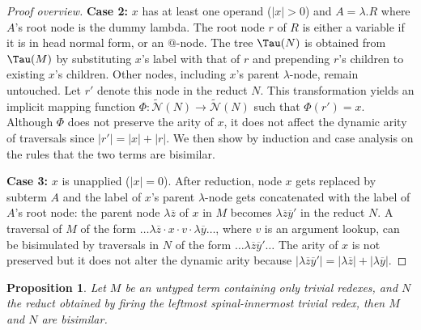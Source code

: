 \documentclass[xchauthor,chkrefs,GCNS,amsmath,amsthm,rotating,leaveRGB]{tcsg}
\theoremstyle{plain}
\newtheorem{proposition}[theorem]{Proposition}
\theoremstyle{definition}
\newcommand{\Nodes}{\mathcal{N}}
\newcommand{\ExtendedNodes}{\tilde{\Nodes}}
\newcommand{\ctree}{\Tau}
\begin{document}
\begin{proof}[Proof overview]
\textbf{Case 2:} $x$ has at least one operand ($|x|>0$) and $A = \lambda . R$
where $A$'s root node is the dummy lambda. The root node $r$ of $R$ is either
a variable if it is in head normal form, or an $@$-node. The tree $\ctree
(N)$ is obtained from $\ctree (M)$ by substituting $x$'s label with that of
$r$ and prepending $r$'s children to existing $x$'s children. Other nodes,
including $x$'s parent $\lambda $-node, remain untouched. Let $r'$ denote
this node in the reduct $N$. This transformation yields an implicit mapping
function $\Phi : \ExtendedNodes (N)\rightarrow \ExtendedNodes (N)$ such that
$\Phi (r') = x$. Although $\Phi $ does not preserve the arity of $x$, it does
not affect the dynamic arity of traversals since $|r'| = |x| + |r|$. We then
show by induction and case analysis on the rules that the two terms are
bisimilar.

\textbf{Case 3:} $x$ is unapplied ($|x|=0$). After reduction, node $x$ gets
replaced by subterm $A$ and the label of $x$'s parent $\lambda $-node gets
concatenated with the label of $A$'s root node: the parent node $\lambda
\overline{z}$ of $x$ in $M$ becomes $\lambda \overline{z}\overline{y}'$ in
the reduct $N$. A traversal of $M$ of the form $\ldots \lambda \overline{z}
\cdot x \cdot v \cdot \lambda \overline{y} \ldots $, where $v$ is an argument
lookup, can be bisimulated by traversals in $N$ of the form $\ldots \lambda
\overline{z}\overline{y}' \ldots $ The arity of $x$ is not preserved but it
does not alter the dynamic arity because $|\lambda{\overline{z}
\overline{y}'}| = |\lambda{\overline{z}}| +  |\lambda{\overline{y}}|$.
\end{proof}


\begin{proposition}\label{prop:ulctrav_sound_for_trivialreduction}
Let $M$ be an untyped term containing only trivial redexes, and $N$ the
reduct obtained by firing the \emph{leftmost spinal-innermost} trivial redex,
then $M$ and $N$ are bisimilar.
\end{proposition}
\end{document}
